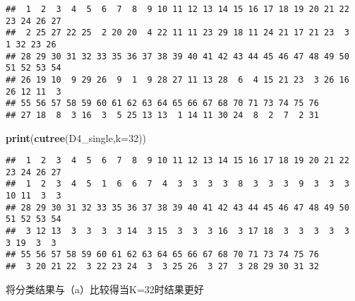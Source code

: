 \documentclass[
]{article}
\newenvironment{Shaded}{\begin{snugshade}}{\end{snugshade}}
\newcommand{\DataTypeTok}[1]{\textcolor[rgb]{0.13,0.29,0.53}{#1}}
\newcommand{\DecValTok}[1]{\textcolor[rgb]{0.00,0.00,0.81}{#1}}
\newcommand{\KeywordTok}[1]{\textcolor[rgb]{0.13,0.29,0.53}{\textbf{#1}}}
\newcommand{\NormalTok}[1]{#1}
\newcommand{\OperatorTok}[1]{\textcolor[rgb]{0.81,0.36,0.00}{\textbf{#1}}}
\begin{document}
\begin{Shaded}
\end{Shaded}

\begin{verbatim}
##  1  2  3  4  5  6  7  8  9 10 11 12 13 14 15 16 17 18 19 20 21 22 23 24 26 27 
##  2 25 27 22 25  2 20 20  4 22 11 11 23 29 18 11 24 21 17 21 23  3  1 32 23 26 
## 28 29 30 31 32 33 35 36 37 38 39 40 41 42 43 44 45 46 47 48 49 50 51 52 53 54 
## 26 19 10  9 29 26  9  1  9 28 27 11 13 28  6  4 15 21 23  3 26 16 26 12 11  3 
## 55 56 57 58 59 60 61 62 63 64 65 66 67 68 70 71 73 74 75 76 
## 27 18  8  3 16  3  5 25 13 13  1 14 11 30 24  8  2  7  2 31
\end{verbatim}

\begin{Shaded}
\begin{Highlighting}[]
\KeywordTok{print}\NormalTok{(}\KeywordTok{cutree}\NormalTok{(D4_single,}\DataTypeTok{k=}\DecValTok{32}\NormalTok{))}
\end{Highlighting}
\end{Shaded}

\begin{verbatim}
##  1  2  3  4  5  6  7  8  9 10 11 12 13 14 15 16 17 18 19 20 21 22 23 24 26 27 
##  1  2  3  4  5  1  6  6  7  4  3  3  3  3  8  3  3  3  9  3  3  3 10 11  3  3 
## 28 29 30 31 32 33 35 36 37 38 39 40 41 42 43 44 45 46 47 48 49 50 51 52 53 54 
##  3 12 13  3  3  3  3 14  3 15  3  3  3 16  3 17 18  3  3  3  3  3  3 19  3  3 
## 55 56 57 58 59 60 61 62 63 64 65 66 67 68 70 71 73 74 75 76 
##  3 20 21 22  3 22 23 24  3  3 25 26  3 27  3 28 29 30 31 32
\end{verbatim}

将分类结果与（a）比较得当K=32时结果更好
\end{document}
